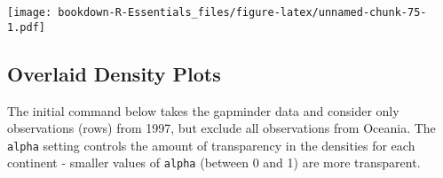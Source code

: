\documentclass[]{book}
\newenvironment{Shaded}{\begin{snugshade}}{\end{snugshade}}
\newcommand{\KeywordTok}[1]{\textcolor[rgb]{0.13,0.29,0.53}{\textbf{#1}}}
\newcommand{\DataTypeTok}[1]{\textcolor[rgb]{0.13,0.29,0.53}{#1}}
\newcommand{\DecValTok}[1]{\textcolor[rgb]{0.00,0.00,0.81}{#1}}
\newcommand{\FloatTok}[1]{\textcolor[rgb]{0.00,0.00,0.81}{#1}}
\newcommand{\StringTok}[1]{\textcolor[rgb]{0.31,0.60,0.02}{#1}}
\newcommand{\CommentTok}[1]{\textcolor[rgb]{0.56,0.35,0.01}{\textit{#1}}}
\newcommand{\OperatorTok}[1]{\textcolor[rgb]{0.81,0.36,0.00}{\textbf{#1}}}
\newcommand{\NormalTok}[1]{#1}
\begin{document}
\begin{Shaded}
\end{Shaded}

\texttt{[image: bookdown-R-Essentials\_files/figure-latex/unnamed-chunk-75-1.pdf]}

\subsection{Overlaid Density Plots}\label{overlaid-density-plots}

The initial command below takes the gapminder data and consider only
observations (rows) from 1997, but exclude all observations from
Oceania. The \texttt{alpha} setting controls the amount of transparency
in the densities for each continent - smaller values of \texttt{alpha}
(between 0 and 1) are more transparent.
\end{document}
